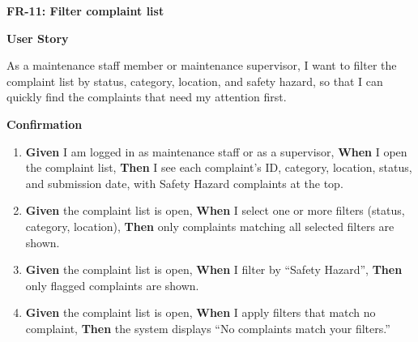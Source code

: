 \noindent\textbf{FR-11: Filter complaint list}\par\nopagebreak[4]\smallskip
\noindent\textbf{User Story}\par\nopagebreak[4]
\noindent As a maintenance staff member or maintenance supervisor, I want to filter the complaint list by status, category, location, and safety hazard, so that I can quickly find the complaints that need my attention first.\par\smallskip
{\makeatletter
{}
\makeatother
\noindent\textbf{Confirmation}\par\nopagebreak[4]\vspace{-6pt}\nopagebreak[4]
\begin{enumerate}\setlength{\itemsep}{2pt}\setlength{\parsep}{0pt}\setlength{\topsep}{2pt}\setlength{\partopsep}{0pt}
  \item \textbf{Given} I am logged in as maintenance staff or as a supervisor, \textbf{When} I open the complaint list, \textbf{Then} I see each complaint's ID, category, location, status, and submission date, with Safety Hazard complaints at the top.
  \item \textbf{Given} the complaint list is open, \textbf{When} I select one or more filters (status, category, location), \textbf{Then} only complaints matching all selected filters are shown.
  \item \textbf{Given} the complaint list is open, \textbf{When} I filter by ``Safety Hazard'', \textbf{Then} only flagged complaints are shown.
  \item \textbf{Given} the complaint list is open, \textbf{When} I apply filters that match no complaint, \textbf{Then} the system displays ``No complaints match your filters.''
\end{enumerate}}
\medskip
 
